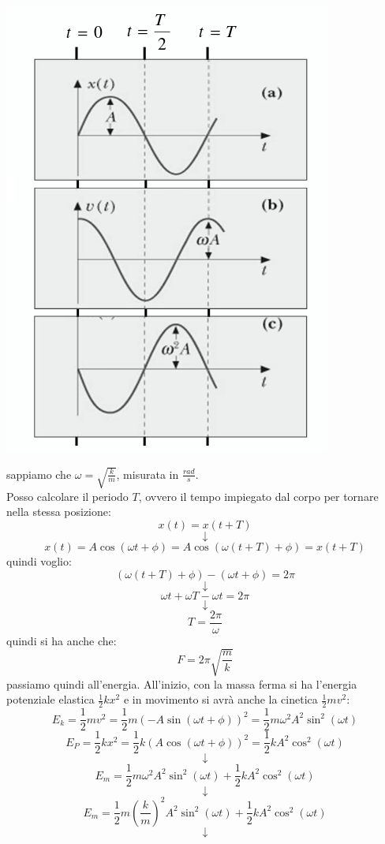 \documentclass[a4paper,12pt, oneside]{book}
\begin{document}
\begin{center}
\includegraphics[scale=0.7]{img/arm.png}
\end{center}
sappiamo che $\omega=\sqrt{\frac{k}{m}}$, misurata in $\frac{rad}{s}$.
\\Posso calcolare il periodo $T$, ovvero il tempo impiegato dal corpo per tornare nella stessa posizione:
$$x(t)=x(t+T)$$
$$\downarrow$$
$$x(t)=A\cos(\omega t+\phi)=A\cos(\omega (t+T)+\phi)=x(t+T)$$
quindi voglio:
$$(\omega(t+T)+\phi)-(\omega t+\phi)=2\pi$$
$$\downarrow$$
$$\omega t+\omega T-\omega t= 2\pi$$
$$\downarrow$$
$$T=\frac{2\pi}{\omega}$$
quindi si ha anche che:
$$F=2\pi\sqrt{\frac{m}{k}}$$
passiamo quindi all'energia. All'inizio, con la massa ferma si ha l'energia potenziale elastica $\frac{1}{2}kx^2$ e in movimento si avrà anche la cinetica $\frac{1}{2}mv^2$:
$$E_k=\frac{1}{2}mv^2=\frac{1}{2}m(-A\sin(\omega t+\phi))^2=\frac{1}{2}m\omega^2A^2\sin^2(\omega t)$$
$$E_P=\frac{1}{2}kx^2=\frac{1}{2}k(A\cos(\omega t+\phi))^2=\frac{1}{2}kA^2\cos^2(\omega t)$$
$$\downarrow$$
$$E_m=\frac{1}{2}m\omega^2A^2\sin^2(\omega t)+\frac{1}{2}kA^2\cos^2(\omega t)$$
$$\downarrow$$
$$E_m=\frac{1}{2}m\left(\frac{k}{m}\right)^2A^2\sin^2(\omega t)+\frac{1}{2}kA^2\cos^2(\omega t)$$
$$\downarrow$$
\end{document}
